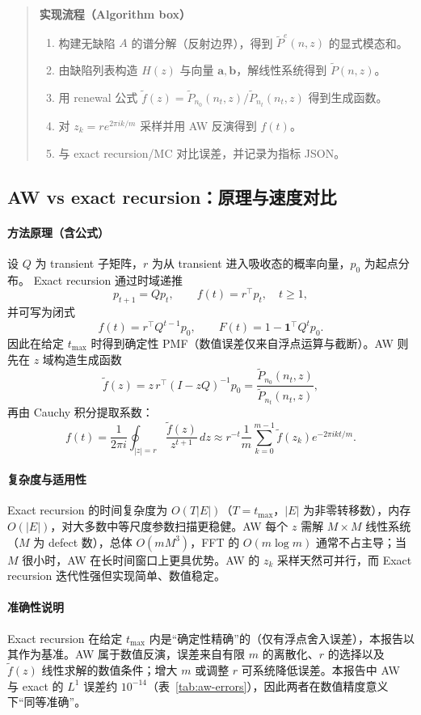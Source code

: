 \documentclass[11pt,fontset=fandol]{ctexart}
\begin{document}
\begin{quote}
\textbf{实现流程（Algorithm box）}
\begin{enumerate}[leftmargin=*, itemsep=0pt]
  \item 构建无缺陷 $A$ 的谱分解（反射边界），得到 $\tilde P^e(n,z)$ 的显式模态和。
  \item 由缺陷列表构造 $H(z)$ 与向量 $\mathbf{a},\mathbf{b}$，解线性系统得到 $\tilde P(n,z)$。
  \item 用 renewal 公式 $\tilde f(z)=\tilde P_{n_0}(n_t,z)/\tilde P_{n_t}(n_t,z)$ 得到生成函数。
  \item 对 $z_k=r e^{2\pi i k/m}$ 采样并用 AW 反演得到 $f(t)$。
  \item 与 exact recursion/MC 对比误差，并记录为指标 JSON。
\end{enumerate}
\end{quote}

\subsection{AW vs exact recursion：原理与速度对比}
\paragraph{方法原理（含公式）}
设 $Q$ 为 transient 子矩阵，$r$ 为从 transient 进入吸收态的概率向量，$p_0$ 为起点分布。
Exact recursion 通过时域递推
\[
  p_{t+1}=Qp_t,\qquad f(t)=r^\top p_t,\quad t\ge 1,
\]
并可写为闭式
\[
  f(t)=r^\top Q^{t-1}p_0,\qquad F(t)=1-\mathbf{1}^\top Q^t p_0.
\]
因此在给定 $t_{\max}$ 时得到确定性 PMF（数值误差仅来自浮点运算与截断）。AW 则先在 $z$ 域构造生成函数
\[
  \tilde f(z)=z\,r^\top (I-zQ)^{-1}p_0
  =\frac{\tilde P_{n_0}(n_t,z)}{\tilde P_{n_t}(n_t,z)},
\]
再由 Cauchy 积分提取系数：
\[
  f(t)=\frac{1}{2\pi i}\oint_{|z|=r}\frac{\tilde f(z)}{z^{t+1}}\,dz
  \approx r^{-t}\frac{1}{m}\sum_{k=0}^{m-1}\tilde f(z_k)e^{-2\pi i k t/m}.
\]

\paragraph{复杂度与适用性}
Exact recursion 的时间复杂度为 $O(T|E|)$（$T=t_{\max}$，$|E|$ 为非零转移数），内存 $O(|E|)$，对大多数中等尺度参数扫描更稳健。AW 每个 $z$ 需解 $M\times M$ 线性系统（$M$ 为 defect 数），总体 $O(m M^3)$，FFT 的 $O(m\log m)$ 通常不占主导；当 $M$ 很小时，AW 在长时间窗口上更具优势。AW 的 $z_k$ 采样天然可并行，而 Exact recursion 迭代性强但实现简单、数值稳定。

\paragraph{准确性说明}
Exact recursion 在给定 $t_{\max}$ 内是“确定性精确”的（仅有浮点舍入误差），本报告以其作为基准。AW 属于数值反演，误差来自有限 $m$ 的离散化、$r$ 的选择以及 $\tilde f(z)$ 线性求解的数值条件；增大 $m$ 或调整 $r$ 可系统降低误差。本报告中 AW 与 exact 的 $L^1$ 误差约 $10^{-14}$（表~\ref{tab:aw-errors}），因此两者在数值精度意义下“同等准确”。
\end{document}
